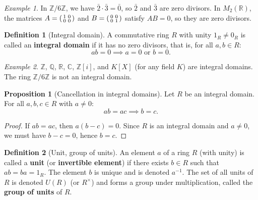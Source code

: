 \documentclass[12pt,a4paper,openany]{book}
\theoremstyle{definition}
\newtheorem{definition}{Definition}[chapter]
\newtheorem{proposition}{Proposition}[chapter]
\theoremstyle{remark}
\newtheorem{example}{Example}[chapter]
\begin{document}
\begin{example}\label{ex:zero-div-Z6}
In $\mathbb{Z}/6\mathbb{Z}$, we have $\bar{2}\cdot\bar{3}=\bar{0}$, so $\bar{2}$ and $\bar{3}$ are zero divisors. In $M_2(\mathbb{R})$, the matrices
$A=\begin{psmallmatrix}1&0\\0&0\end{psmallmatrix}$ and $B=\begin{psmallmatrix}0&0\\0&1\end{psmallmatrix}$
satisfy $AB=0$, so they are zero divisors.
\end{example}

\begin{definition}[Integral domain]\label{def:integral-domain}
A commutative ring $R$ with unity $1_R\neq 0_R$ is called an \textbf{integral domain} if it has no zero divisors, that is, for all $a,b\in R$:
\[
    ab=0 \implies a=0 \text{ or } b=0.
\]
\end{definition}

\begin{example}\label{ex:integral-domains}
$\mathbb{Z}$, $\mathbb{Q}$, $\mathbb{R}$, $\mathbb{C}$, $\mathbb{Z}[i]$, and $K[X]$ (for any field $K$) are integral domains. The ring $\mathbb{Z}/6\mathbb{Z}$ is not an integral domain.
\end{example}

\begin{proposition}[Cancellation in integral domains]\label{prop:cancellation-domain}
Let $R$ be an integral domain. For all $a,b,c\in R$ with $a\neq 0$:
\[
    ab=ac \implies b=c.
\]
\end{proposition}

\begin{proof}
If $ab=ac$, then $a(b-c)=0$. Since $R$ is an integral domain and $a\neq 0$, we must have $b-c=0$, hence $b=c$.
\end{proof}

\begin{definition}[Unit, group of units]\label{def:unit}
An element $a$ of a ring $R$ (with unity) is called a \textbf{unit} (or \textbf{invertible element}) if there exists $b\in R$ such that $ab=ba=1_R$. The element $b$ is unique and is denoted $a^{-1}$. The set of all units of $R$ is denoted $U(R)$ (or $R^{\times}$) and forms a group under multiplication, called the \textbf{group of units} of $R$.
\end{definition}
\end{document}
